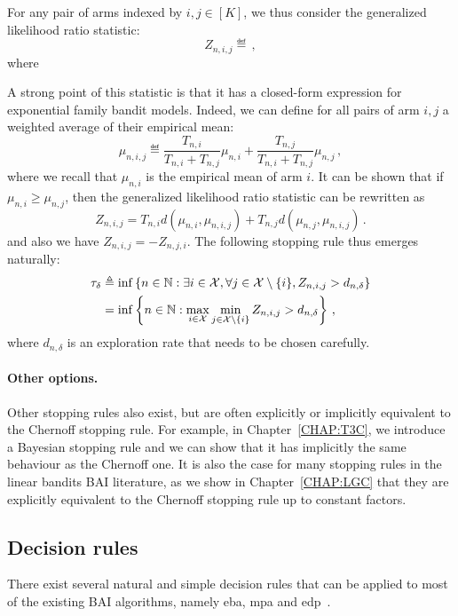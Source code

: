 For any pair of arms indexed by $i, j \in [K]$, we thus consider the generalized likelihood ratio statistic:
\[
    Z_{n,i,j} \eqdef\,,
\]
where

A strong point of this statistic is that it has a closed-form expression for exponential family bandit models. Indeed, we can define for all pairs of arm $i, j$ a weighted average of their empirical mean:
\[
    \mu_{n,i,j} \eqdef \frac{T_{n,i}}{T_{n,i}+T_{n,j}}\mu_{n,i} + \frac{T_{n,j}}{T_{n,i}+T_{n,j}}\mu_{n,j}\,,
\]
where we recall that $\mu_{n,i}$ is the empirical mean of arm $i$. It can be shown that if $\mu_{n,i} \geq \mu_{n,j}$, then the generalized likelihood ratio statistic can be rewritten as
\[
    Z_{n,i,j} = T_{n,i}d(\mu_{n,i}, \mu_{n,i,j}) + T_{n,j}d(\mu_{n,j}, \mu_{n,i,j})\,.
\]
and also we have $Z_{n,i,j} = -Z_{n,j,i}$. The following stopping rule thus emerges naturally:
\begin{align}\label{eq:mab.glr}
    \tau_\delta &\triangleq \inf \left\lbrace n \in {\mathbb N} : \exists i \in \mathcal{X}, \forall j \in \mathcal{X} \setminus \{i\}, Z_{n,i,j} > d_{n,\delta} \right\rbrace\nonumber \\
    &= \inf \left\lbrace n \in {\mathbb N} : \max_{i \in \mathcal{X}} \min_{j \in \mathcal{X} \setminus \{i\}} Z_{n,i,j} > d_{n,\delta} \right\rbrace\,,
\end{align}
where $d_{n,\delta}$ is an exploration rate that needs to be chosen carefully.

\paragraph{Other options.}
Other stopping rules also exist, but are often explicitly or implicitly equivalent to the Chernoff stopping rule. For example, in Chapter~\ref{CHAP:T3C}, we introduce a \gls{Bayesian stopping rule} and we can show that it has implicitly the same behaviour as the Chernoff one. It is also the case for many stopping rules in the linear bandits BAI literature, as we show in Chapter~\ref{CHAP:LGC} that they are explicitly equivalent to the Chernoff stopping rule up to constant factors.

\subsection{Decision rules}\label{sec:mab.bai.decision}

There exist several natural and simple decision rules that can be applied to most of the existing BAI algorithms, namely \gls{eba}, \gls{mpa} and \gls{edp}~\citep{bubeck2009pure}.

